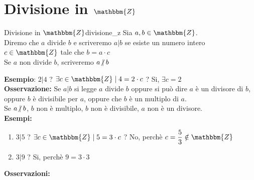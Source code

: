 \documentclass[12pt, letterpaper]{report}
\newcounter{definition}
\newcommand{\nmu}{}
\begin{document}
		\chapter{Divisione in $\mathbbm{Z}$}
		\begin{definition}{\nmu Divisione in $\mathbbm{Z}$}{divisione_z}
			Sia $a, b \in \mathbbm{Z}$. \\
			Diremo che $a$ divide $b$ e scriveremo $a|b$ se esiste un numero intero $c \in \mathbbm{Z}$ tale che $b = a \cdot c$ \\
			Se $a$ non divide $b$, scriveremo $a\centernot{|}b$
		\end{definition}
		\textbf{Esempio}: $2|4$ ? $\exists c \in \mathbbm{Z} \mid 4 = 2 \cdot c$ ? Si, $\exists c = 2$ \\
		\textbf{Osservazione:} Se $a|b$ si legge $a$ divide $b$ oppure si può dire $a$ è un divisore di $b$, oppure $b$ è divisibile per $a$, oppure che $b$ è un multiplo di $a$. \\
		Se $a\centernot{|}b$, $b$ non è multiplo, $b$ non è divisibile, $a$ non è un divisore. \\
		\textbf{Esempi:}
		\begin{enumerate}
			\item $3|5$ ? $\exists c \in \mathbbm{Z} \mid 5 = 3 \cdot c$ ? No, perchè $c = \dfrac{5}{3} \notin \mathbbm{Z}$
			\item $3|9$ ? Si, perchè $9 = 3 \cdot 3$
		\end{enumerate}
		\textbf{Osservazioni:}
\end{document}
